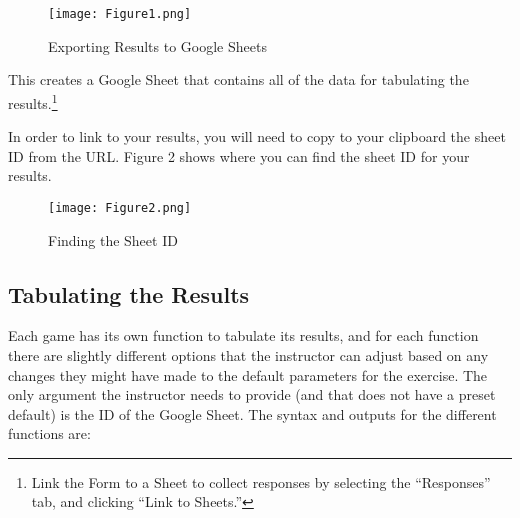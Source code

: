 \documentclass[
]{article}
\begin{document}
\begin{figure}
\centering
\texttt{[image: Figure1.png]}
\caption{Exporting Results to Google Sheets}
\end{figure}

This creates a Google Sheet that contains all of the data for tabulating
the results.\footnote{Link the Form to a Sheet to collect responses by
  selecting the ``Responses'' tab, and clicking ``Link to Sheets.''}

In order to link to your results, you will need to copy to your
clipboard the sheet ID from the URL. Figure 2 shows where you can find
the sheet ID for your results.

\begin{figure}
\centering
\texttt{[image: Figure2.png]}
\caption{Finding the Sheet ID}
\end{figure}

\hypertarget{tabulating-the-results}{%
\subsection{Tabulating the Results}\label{tabulating-the-results}}

Each game has its own function to tabulate its results, and for each
function there are slightly different options that the instructor can
adjust based on any changes they might have made to the default
parameters for the exercise. The only argument the instructor needs to
provide (and that does not have a preset default) is the ID of the
Google Sheet. The syntax and outputs for the different functions are:
\end{document}
